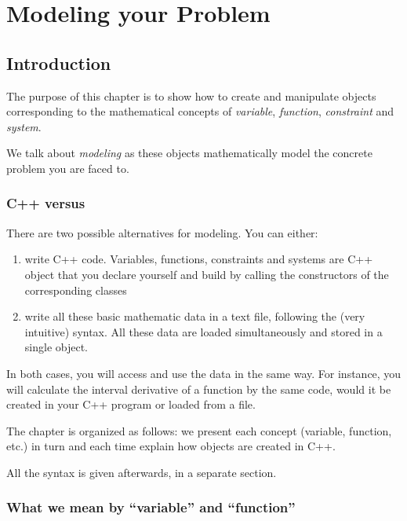 \chapter{Modeling your Problem}\label{chap:mod}


\section{Introduction}

The purpose of this chapter is to show how to create and manipulate
objects corresponding to the mathematical concepts of
{\it variable}, {\it function}, {\it constraint} and {\it system}.

We talk about {\it modeling} as these objects mathematically model the concrete problem you are faced to.

\subsection{C++ versus \quimper}

There are two possible alternatives for modeling.
You can either:
\begin{enumerate}
\item write C++ code. Variables, functions, constraints
and systems are C++ object that you declare yourself
and build by calling the constructors of the corresponding classes
\item write all these basic mathematic data in a text file, following
the (very intuitive) \quimper syntax. All these data are loaded
simultaneously and stored in a single  object.
\end{enumerate}

In both cases, you will access and use the data in the same way.
For instance, you will calculate the interval derivative of a function
by the same code, would it be created in your C++ program or loaded
from a \quimper file.

The chapter is organized as follows: we present
each concept (variable, function, etc.) in turn and
each time explain how objects are created in C++.

All the \quimper syntax is given afterwards, in a separate section.
 
\subsection{What we mean by ``variable'' and ``function''}

